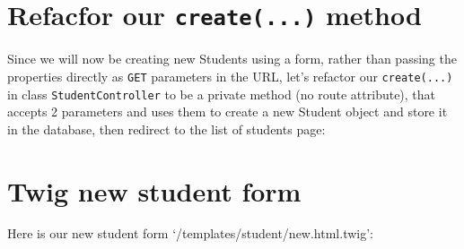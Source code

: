 \documentclass[a4paperpaper,openright]{book}
\newenvironment{Shaded}{}{}
\newcommand{\FunctionTok}[1]{\textcolor[rgb]{0.02,0.16,0.49}{#1}}
\newcommand{\KeywordTok}[1]{\textcolor[rgb]{0.00,0.44,0.13}{\textbf{#1}}}
\newcommand{\NormalTok}[1]{#1}
\newcommand{\OtherTok}[1]{\textcolor[rgb]{0.00,0.44,0.13}{#1}}
\newcommand{\StringTok}[1]{\textcolor[rgb]{0.25,0.44,0.63}{#1}}
\begin{document}
\hypertarget{refacfor-our-create...-method}{%
\section{\texorpdfstring{Refacfor our \texttt{create(...)}
method}{Refacfor our create(...) method}}\label{refacfor-our-create...-method}}

Since we will now be creating new Students using a form, rather than
passing the properties directly as \texttt{GET} parameters in the URL,
let's refactor our \texttt{create(...)} in class
\texttt{StudentController} to be a private method (no route attribute),
that accepts 2 parameters and uses them to create a new Student object
and store it in the database, then redirect to the list of students
page:

\begin{Shaded}
\end{Shaded}

\hypertarget{twig-new-student-form}{%
\section{Twig new student form}\label{twig-new-student-form}}

Here is our new student form `/templates/student/new.html.twig':
\end{document}
